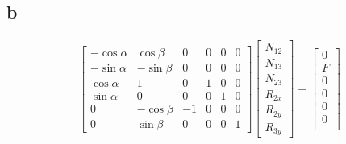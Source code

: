 \documentclass[11pt]{article}
\numberwithin{equation}{section}
\begin{document}
\subsection{b}
\begin{gather}
    \begin{bmatrix}
        -\cos \alpha & \cos \beta & 0 & 0 & 0 & 0\\
        -\sin \alpha & -\sin \beta & 0 & 0 & 0 &0\\
        \cos \alpha & 1 & 0 & 1 & 0 & 0\\
        \sin \alpha & 0 & 0& 0 & 1 & 0\\
        0 & -\cos \beta & -1 & 0 & 0 & 0\\
        0 & \sin \beta & 0 & 0 & 0 & 1
    \end{bmatrix} \begin{bmatrix}
        N_{12}\\
        N_{13}\\
        N_{23}\\
        R_{2x}\\
        R_{2y}\\
        R_{3y}        
    \end{bmatrix} = \begin{bmatrix}
        0\\
        F\\
        0\\
        0\\
        0\\
        0\\
    \end{bmatrix}
\end{gather}
\end{document}
